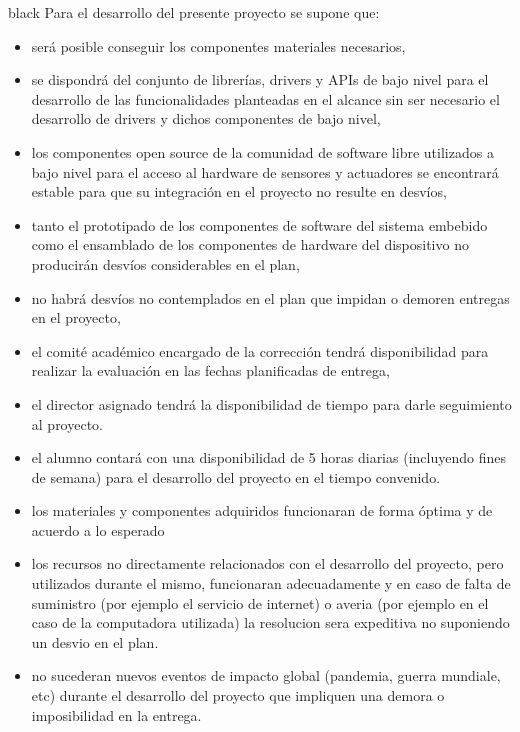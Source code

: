 \documentclass[
11pt, %
]{charter}
\begin{document}
\begin{consigna}{black}
Para el desarrollo del presente proyecto se supone que: 

\begin{itemize}
	\item será posible conseguir los componentes materiales necesarios,
	\item se dispondrá del conjunto de librerías, drivers y APIs de bajo nivel para el desarrollo de las funcionalidades planteadas en el alcance sin ser necesario el desarrollo de drivers y dichos componentes de bajo nivel,
	\item los componentes open source de la comunidad de software libre utilizados a bajo nivel para el acceso al hardware de sensores y actuadores se encontrará estable para que su integración en el proyecto no resulte en desvíos,	
	\item tanto el prototipado de los componentes de software del sistema embebido como el ensamblado de los componentes de hardware del dispositivo no producirán desvíos considerables en el plan,
	\item no habrá desvíos no contemplados en el plan que impidan o demoren entregas en el proyecto,
	\item el comité académico encargado de la corrección tendrá disponibilidad para realizar la evaluación en las fechas planificadas de entrega,
	\item el director asignado tendrá la disponibilidad de tiempo para darle seguimiento al proyecto.
	\item el alumno contará con una disponibilidad de 5 horas diarias (incluyendo fines de semana) para el desarrollo del proyecto en el tiempo convenido.
	\item los materiales y componentes adquiridos funcionaran de forma óptima y de acuerdo a lo esperado
	\item los recursos no directamente relacionados con el desarrollo del proyecto, pero utilizados durante el mismo, funcionaran adecuadamente y en caso de falta de suministro (por ejemplo el servicio de internet) o averia (por ejemplo en el caso de la computadora utilizada) la resolucion sera expeditiva no suponiendo un desvio en el plan.
	\item no sucederan nuevos eventos de impacto global (pandemia, guerra mundiale, etc) durante el desarrollo del proyecto que impliquen una demora o imposibilidad en la entrega.
\end{itemize}


\end{consigna}
\end{document}
